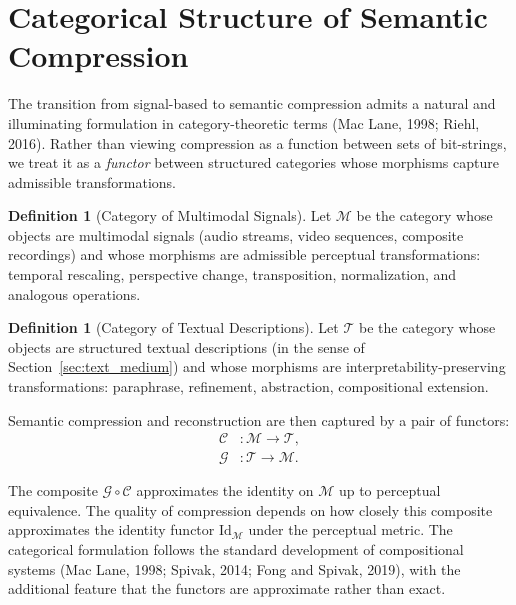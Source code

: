\documentclass[11pt,a4paper]{article}
\theoremstyle{definition}
\newtheorem{definition}[theorem]{Definition}
\theoremstyle{remark}
\begin{document}
\section{Categorical Structure of Semantic Compression}
\label{sec:categorical}

The transition from signal-based to semantic compression admits a natural and illuminating formulation in category-theoretic terms (Mac Lane, 1998; Riehl, 2016). Rather than viewing compression as a function between sets of bit-strings, we treat it as a \emph{functor} between structured categories whose morphisms capture admissible transformations.

\begin{definition}[Category of Multimodal Signals]
Let $\mathcal{M}$ be the category whose objects are multimodal signals (audio streams, video sequences, composite recordings) and whose morphisms are admissible perceptual transformations: temporal rescaling, perspective change, transposition, normalization, and analogous operations.
\end{definition}

\begin{definition}[Category of Textual Descriptions]
Let $\mathcal{T}$ be the category whose objects are structured textual descriptions (in the sense of Section~\ref{sec:text_medium}) and whose morphisms are interpretability-preserving transformations: paraphrase, refinement, abstraction, compositional extension.
\end{definition}

Semantic compression and reconstruction are then captured by a pair of functors:
\begin{align}
\mathcal{C} &: \mathcal{M} \rightarrow \mathcal{T}, \\
\mathcal{G} &: \mathcal{T} \rightarrow \mathcal{M}.
\end{align}

The composite $\mathcal{G} \circ \mathcal{C}$ approximates the identity on $\mathcal{M}$ up to perceptual equivalence. The quality of compression depends on how closely this composite approximates the identity functor $\mathrm{Id}_\mathcal{M}$ under the perceptual metric. The categorical formulation follows the standard development of compositional systems (Mac Lane, 1998; Spivak, 2014; Fong and Spivak, 2019), with the additional feature that the functors are approximate rather than exact.
\end{document}
